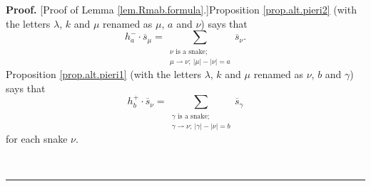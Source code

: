 \documentclass[numbers=enddot,12pt,final,onecolumn,notitlepage]{scrartcl}%
\theoremstyle{definition}
\newenvironment{proof}[1][Proof]{\noindent\textbf{#1.} }{\ \rule{0.5em}{0.5em}}
\let\sumnonlimits\sum
\renewcommand{\sum}{\sumnonlimits\limits}
\begin{document}
\begin{proof}
[Proof of Lemma \ref{lem.Rmab.formula}.]Proposition \ref{prop.alt.pieri2}
(with the letters $\lambda$, $k$ and $\mu$ renamed as $\mu$, $a$ and $\nu$)
says that%
\begin{equation}
h_{a}^{-}\cdot\overline{s}_{\mu}=\sum_{\substack{\nu\text{ is a snake;}%
\\\mu\rightharpoonup\nu;\ \left\vert \mu\right\vert -\left\vert \nu\right\vert
=a}}\overline{s}_{\nu}. \label{pf.lem.Rmab.formula.1}%
\end{equation}
Proposition \ref{prop.alt.pieri1} (with the letters $\lambda$, $k$ and $\mu$
renamed as $\nu$, $b$ and $\gamma$) says that%
\begin{equation}
h_{b}^{+}\cdot\overline{s}_{\nu}=\sum_{\substack{\gamma\text{ is a
snake;}\\\gamma\rightharpoonup\nu;\ \left\vert \gamma\right\vert -\left\vert
\nu\right\vert =b}}\overline{s}_{\gamma} \label{pf.lem.Rmab.formula.2}%
\end{equation}
for each snake $\nu$.


\end{proof}
\end{document}
